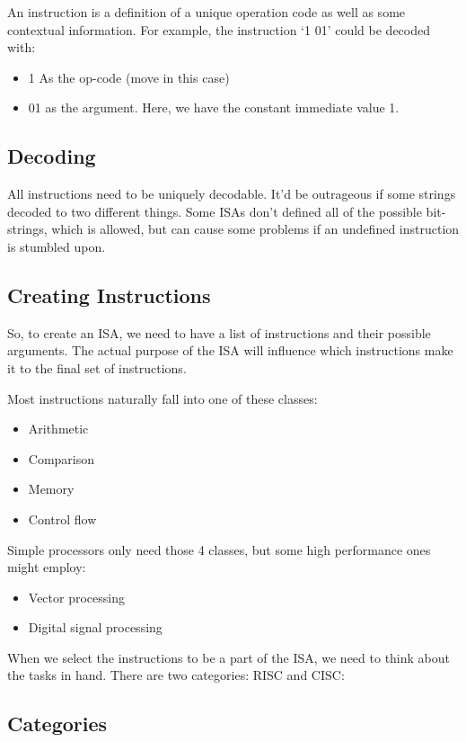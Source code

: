 \documentclass[11pt,a4paper,titlepage,dvipsnames,cmyk]{scrartcl}
\begin{document}
An instruction is a definition of a unique operation code as well as some
contextual information. For example, the instruction `1 01' could be
decoded with:
\begin{itemize}
    \item 1 As the op-code (move in this case)
    \item 01 as the argument. Here, we have the constant immediate value
        1.
\end{itemize}

\subsection{Decoding}%
\label{sub:Decoding}
All instructions need to be uniquely decodable. It'd be outrageous if some
strings decoded to two different things. Some ISAs don't defined all of
the possible bit-strings, which is allowed, but can cause some problems if
an undefined instruction is stumbled upon.

\subsection{Creating Instructions}%
\label{sub:Creating Instructions}
So, to create an ISA, we need to have a list of instructions and their
possible arguments. The actual purpose of the ISA will influence which
instructions make it to the final set of instructions.

Most instructions naturally fall into one of these classes:

\begin{itemize}
    \item Arithmetic
    \item Comparison
    \item Memory 
    \item Control flow
\end{itemize}

Simple processors only need those 4 classes, but some high performance
ones might employ:

\begin{itemize}
    \item Vector processing
    \item Digital signal processing
\end{itemize}

When we select the instructions to be a part of the ISA, we need to think
about the tasks in hand. There are two categories: RISC and CISC:

\subsection{Categories}%
\label{sub:Categories}
\end{document}

